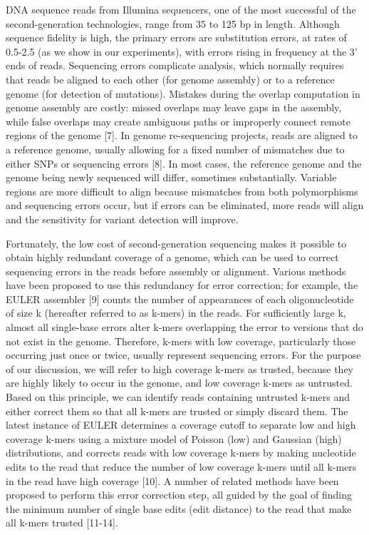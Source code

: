 \documentclass[11pt]{article}
\begin{document}
DNA sequence reads from Illumina sequencers, one of the most successful of the second-generation technologies, range from 35 to 125 bp in length. Although sequence fidelity is high, the primary errors are substitution errors, at rates of 0.5-2.5 (as we show in our experiments), with errors rising in frequency at the 3' ends of reads. Sequencing errors complicate analysis, which normally requires that reads be aligned to each other (for genome assembly) or to a reference genome (for detection of mutations). Mistakes during the overlap computation in genome assembly are costly: missed overlaps may leave gaps in the assembly, while false overlaps may create ambiguous paths or improperly connect remote regions of the genome [7]. In genome re-sequencing projects, reads are aligned to a reference genome, usually allowing for a fixed number of mismatches due to either SNPs or sequencing errors [8]. In most cases, the reference genome and the genome being newly sequenced will differ, sometimes substantially. Variable regions are more difficult to align because mismatches from both polymorphisms and sequencing errors occur, but if errors can be eliminated, more reads will align and the sensitivity for variant detection will improve.

Fortunately, the low cost of second-generation sequencing makes it possible to obtain highly redundant coverage of a genome, which can be used to correct sequencing errors in the reads before assembly or alignment. Various methods have been proposed to use this redundancy for error correction; for example, the EULER assembler [9] counts the number of appearances of each oligonucleotide of size k (hereafter referred to as k-mers) in the reads. For sufficiently large k, almost all single-base errors alter k-mers overlapping the error to versions that do not exist in the genome. Therefore, k-mers with low coverage, particularly those occurring just once or twice, usually represent sequencing errors. For the purpose of our discussion, we will refer to high coverage k-mers as trusted, because they are highly likely to occur in the genome, and low coverage k-mers as untrusted. Based on this principle, we can identify reads containing untrusted k-mers and either correct them so that all k-mers are trusted or simply discard them. The latest instance of EULER determines a coverage cutoff to separate low and high coverage k-mers using a mixture model of Poisson (low) and Gaussian (high) distributions, and corrects reads with low coverage k-mers by making nucleotide edits to the read that reduce the number of low coverage k-mers until all k-mers in the read have high coverage [10]. A number of related methods have been proposed to perform this error correction step, all guided by the goal of finding the minimum number of single base edits (edit distance) to the read that make all k-mers trusted [11-14].
\end{document}
